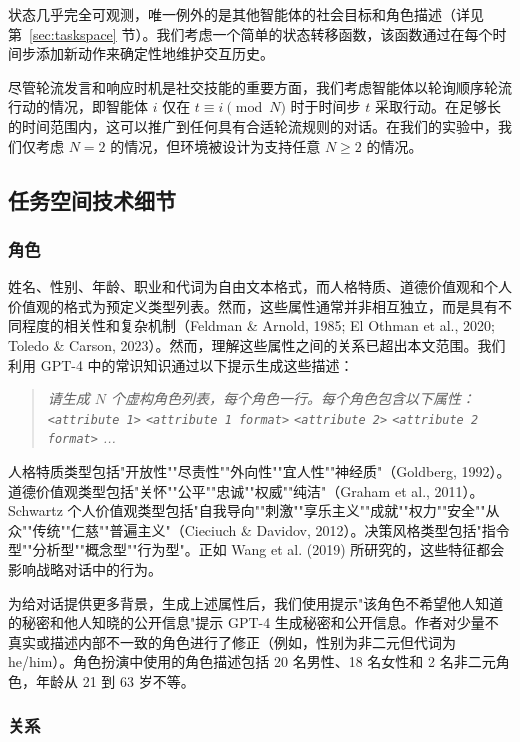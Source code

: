 \documentclass[11pt,a4paper]{article}
\begin{document}
状态几乎完全可观测，唯一例外的是其他智能体的社会目标和角色描述（详见第~\ref{sec:taskspace} 节）。我们考虑一个简单的状态转移函数，该函数通过在每个时间步添加新动作来确定性地维护交互历史。

尽管轮流发言和响应时机是社交技能的重要方面，我们考虑智能体以轮询顺序轮流行动的情况，即智能体 $i$ 仅在 $t \equiv i \pmod N$ 时于时间步 $t$ 采取行动。在足够长的时间范围内，这可以推广到任何具有合适轮流规则的对话。在我们的实验中，我们仅考虑 $N = 2$ 的情况，但环境被设计为支持任意 $N \geq 2$ 的情况。

\subsection{任务空间技术细节}

\subsubsection*{角色}

姓名、性别、年龄、职业和代词为自由文本格式，而人格特质、道德价值观和个人价值观的格式为预定义类型列表。然而，这些属性通常并非相互独立，而是具有不同程度的相关性和复杂机制（Feldman \& Arnold, 1985; El Othman et al., 2020; Toledo \& Carson, 2023）。然而，理解这些属性之间的关系已超出本文范围。我们利用 GPT-4 中的常识知识通过以下提示生成这些描述：

\begin{quote}
\small\itshape 请生成 $N$ 个虚构角色列表，每个角色一行。每个角色包含以下属性：\texttt{<attribute 1>} \texttt{<attribute 1 format>} \texttt{<attribute 2>} \texttt{<attribute 2 format>} ...
\end{quote}

人格特质类型包括"开放性""尽责性""外向性""宜人性""神经质"（Goldberg, 1992）。道德价值观类型包括"关怀""公平""忠诚""权威""纯洁"（Graham et al., 2011）。Schwartz 个人价值观类型包括"自我导向""刺激""享乐主义""成就""权力""安全""从众""传统""仁慈""普遍主义"（Cieciuch \& Davidov, 2012）。决策风格类型包括"指令型""分析型""概念型""行为型"。正如 Wang et al. (2019) 所研究的，这些特征都会影响战略对话中的行为。

为给对话提供更多背景，生成上述属性后，我们使用提示"该角色不希望他人知道的秘密和他人知晓的公开信息"提示 GPT-4 生成秘密和公开信息。作者对少量不真实或描述内部不一致的角色进行了修正（例如，性别为非二元但代词为 he/him）。角色扮演中使用的角色描述包括 20 名男性、18 名女性和 2 名非二元角色，年龄从 21 到 63 岁不等。

\subsubsection*{关系}
\end{document}
